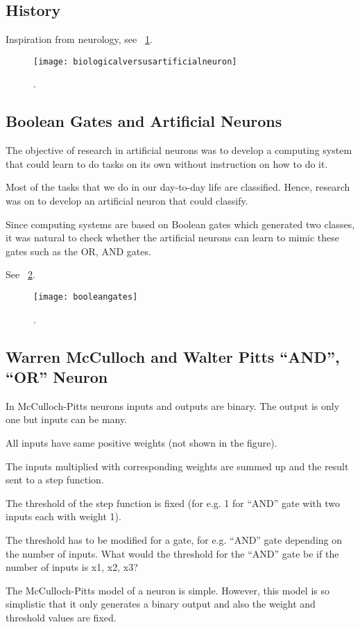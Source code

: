 	\subsection{History}
Inspiration from neurology, see \figurename~\ref{fig:biologicalversusartificialneuron}.
 	\begin{figure}[h]
		\centering
		\texttt{[image: biologicalversusartificialneuron]}
		\caption{.}
		\label{fig:biologicalversusartificialneuron}
	\end{figure}

	\subsection{Boolean Gates and Artificial Neurons}

	\begin{bulletedlist}
		\item The objective of research in artificial neurons was to develop a computing system that could learn to do tasks on its own without instruction on how to do it.
		\item Most of the tasks that we do in our day-to-day life are classified. Hence, research was on to develop an artificial neuron that could classify.
		\item Since computing systems are based on Boolean gates which generated two classes, it was natural to check whether the artificial neurons can learn to mimic these gates such as the OR, AND gates.
	\end{bulletedlist}
See \figurename~\ref{fig:booleangates}.
 	\begin{figure}[h]
		\centering
		\texttt{[image: booleangates]}
		\caption{.}
		\label{fig:booleangates}
	\end{figure}

	\subsection{Warren McCulloch and Walter Pitts ``AND'', ``OR'' Neuron}

	\begin{bulletedlist}
		\item In McCulloch-Pitts neurons inputs and outputs are binary. The output is only one but inputs can be many.
		\item All inputs have same positive weights (not shown in the figure).
		\item The inputs multiplied with corresponding weights are summed up and the result sent to a step function.
		\item The threshold of the step function is fixed (for e.g. 1 for ``AND'' gate with two inputs each with weight 1).
		\item The threshold has to be modified for a gate, for e.g. ``AND'' gate depending on the number of inputs.  What would the threshold for the ``AND'' gate be if the number of inputs is x1, x2, x3?
		\item The McCulloch-Pitts model of a neuron is simple. However, this model is so simplistic that it only generates a binary output and also the weight and threshold values are
fixed.
	\end{bulletedlist}


